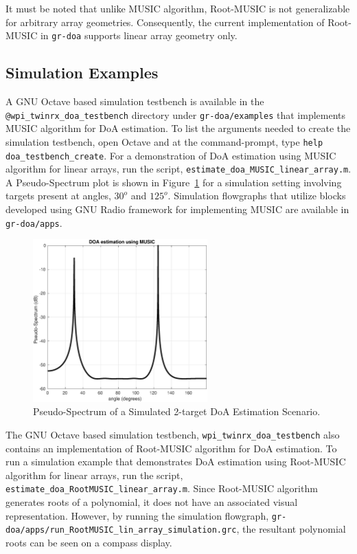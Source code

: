 \documentclass[a4paper, 11pt]{article}
\begin{document}
It must be noted that unlike MUSIC algorithm, Root-MUSIC is not generalizable for arbitrary array geometries. Consequently, the current implementation of Root-MUSIC in \texttt{gr-doa} supports linear array geometry only.

\subsection*{Simulation Examples}
A GNU Octave based simulation testbench is available in the \texttt{@wpi\_twinrx\_doa\_testbench} directory under \texttt{gr-doa/examples} that implements MUSIC algorithm for DoA estimation. To list the arguments needed to create the simulation testbench, open Octave and at the command-prompt, type \texttt{help doa\_testbench\_create}. For a  demonstration of DoA estimation using MUSIC algorithm for linear arrays, run the script, \texttt{estimate\_doa\_MUSIC\_linear\_array.m}. A Pseudo-Spectrum plot is shown in Figure~\ref{music_sim} for a simulation setting involving targets present at angles, $30^o$ and $125^o$. Simulation flowgraphs that utilize blocks developed using GNU Radio framework for implementing MUSIC are available in \texttt{gr-doa/apps}.
\begin{figure}[t]
    \centering
    \includegraphics[width=0.6\textwidth]{figures/MUSIC_lin_array_sim.eps}
    \caption{Pseudo-Spectrum of a Simulated 2-target DoA Estimation Scenario.}
    \label{music_sim}
\end{figure}

The GNU Octave based simulation testbench, \texttt{wpi\_twinrx\_doa\_testbench} also contains an implementation of Root-MUSIC algorithm for DoA estimation. To run a simulation example that demonstrates DoA estimation using Root-MUSIC algorithm for linear arrays, run the script, \texttt{estimate\_doa\_RootMUSIC\_linear\_array.m}. Since Root-MUSIC algorithm generates roots of a polynomial, it does not have an associated visual representation. However, by running the simulation flowgraph, \texttt{gr-doa/apps/run\_RootMUSIC\_lin\_array\_simulation.grc}, the resultant polynomial roots can be seen on a compass display. 
\end{document}
